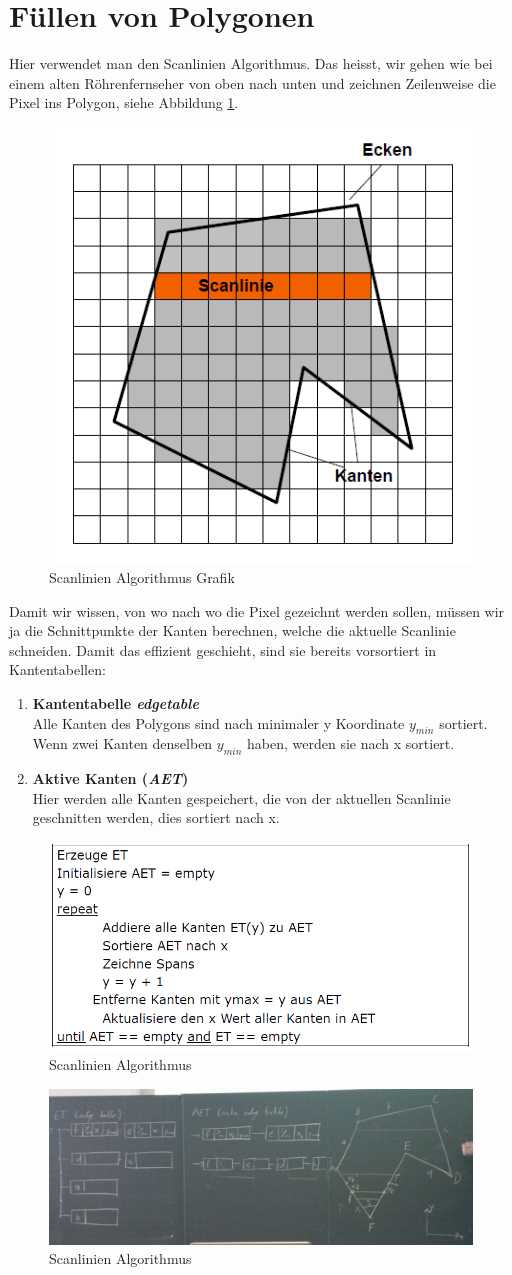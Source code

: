 \section{Füllen von Polygonen}
Hier verwendet man den Scanlinien Algorithmus. Das heisst, wir gehen wie bei einem alten Röhrenfernseher von oben nach unten und zeichnen Zeilenweise die Pixel ins Polygon, siehe Abbildung \ref{scanlinie}. 
\begin{figure}[!ht]
	\centering
	\includegraphics[width=0.4\linewidth]{fig/scanlinie}
	\caption{Scanlinien Algorithmus Grafik}
	\label{scanlinie}
\end{figure}
Damit wir wissen, von wo nach wo die Pixel gezeichnt werden sollen, müssen wir ja die Schnittpunkte der Kanten berechnen, welche die aktuelle Scanlinie schneiden. Damit das effizient geschieht, sind sie bereits vorsortiert in Kantentabellen:
\begin{enumerate}
	\item \textbf{Kantentabelle \textit{edgetable}}\\
	Alle Kanten des Polygons sind nach minimaler y Koordinate \(y_{min}\) sortiert. Wenn zwei Kanten denselben \(y_{min}\) haben, werden sie nach x sortiert.
	\item \textbf{Aktive Kanten (\textit{AET})}\\
	Hier werden alle Kanten gespeichert, die von der aktuellen Scanlinie geschnitten werden, dies sortiert nach x.
\end{enumerate}
\begin{figure}[!ht]
	\centering
	\includegraphics[width=0.5\linewidth]{fig/scanlinie_algo}
	\caption{Scanlinien Algorithmus}
	\label{scanlinie_algo}
\end{figure}
\begin{figure}
\centering
\includegraphics[width=0.7\linewidth]{fig/scanlinie_tafel}
\caption{Scanlinien Algorithmus}
\label{fig:scanlinie_tafel}
\end{figure}

